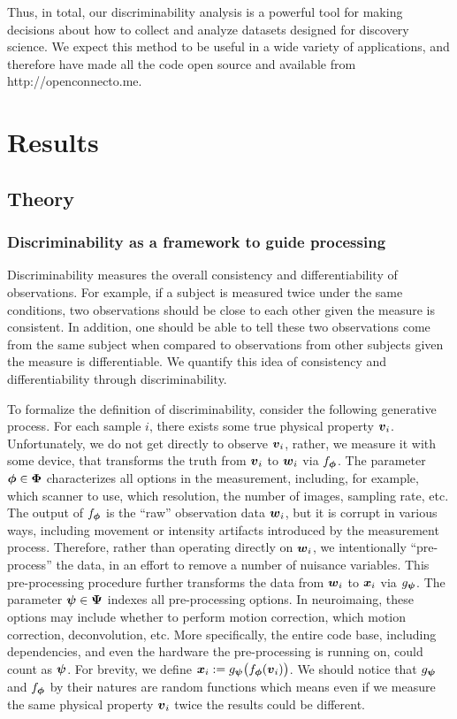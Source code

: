 \documentclass{article}
\begin{document}
Thus, in total, our discriminability analysis is a powerful tool for making decisions about how to collect and analyze datasets designed for discovery science. We expect this method to be useful in a wide variety of applications,
and therefore have made all the code open source and available from http://openconnecto.me.




\section{Results}
\subsection{Theory}

\subsubsection{Discriminability as a framework to guide processing}
Discriminability measures the overall consistency and differentiability of observations. For example, if a subject is measured twice under the same conditions, two observations should be close to each other given the measure is consistent. In addition, one should be able to tell these two observations come from the same subject when compared to observations from other subjects given the measure is differentiable. We quantify this idea of consistency and differentiability through discriminability. 

To formalize the definition of discriminability, consider the following generative process. For each sample $i$, there exists some true physical property $\boldsymbol{v}_i$. Unfortunately, we do not get directly to observe $\boldsymbol{v}_i$, rather, we measure it with some device, that transforms the truth from $\boldsymbol{v}_i$ to $\boldsymbol{w}_i$ via $f_{\boldsymbol{\phi}}$. The parameter $\boldsymbol{\phi} \in \boldsymbol{\Phi}$ characterizes all options in the measurement, including, for example, which scanner to use, which resolution, the number of images, sampling rate, etc.  The output of $f_{\boldsymbol{\phi}}$ is the  ``raw'' observation data $\boldsymbol{w}_i$, but it is corrupt in various ways, including movement or intensity artifacts introduced by the measurement process.  Therefore, rather than operating directly on $\boldsymbol{w}_i$, we intentionally ``pre-process'' the data, in an effort to remove a number of nuisance variables.  This pre-processing procedure further transforms the data from $\boldsymbol{w}_i$ to $\boldsymbol{x}_i$ via $g_{\boldsymbol{\psi}}$.   The parameter $\boldsymbol{\psi} \in \boldsymbol{\Psi}$ indexes all pre-processing options. In neuroimaing, these options may include whether to perform motion correction, which motion correction, deconvolution, etc.  More specifically, the entire code base, including dependencies, and even the hardware the pre-processing is running on, could count as $\boldsymbol{\psi}$. For brevity, we define $\boldsymbol{x}_i:= g_{\boldsymbol{\psi}} \big(f_{\boldsymbol{\phi}} (\boldsymbol{v}_i) \big)$. We should notice that $g_{\boldsymbol{\psi}}$ and $f_{\boldsymbol{\phi}}$ by their natures are random functions which means even if we measure the same physical property $\boldsymbol{v}_i$ twice the results could be different.
\end{document}
